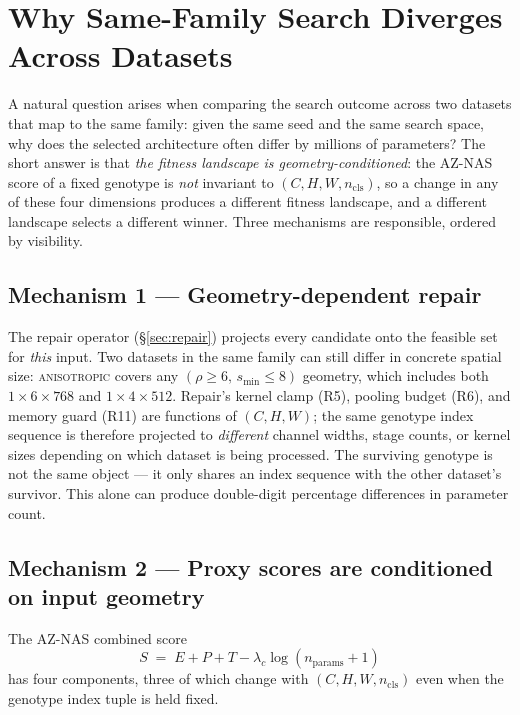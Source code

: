 \documentclass[10pt,twocolumn]{article}
\begin{document}
\section{Why Same-Family Search Diverges Across Datasets}
\label{sec:geometry-sensitivity}

A natural question arises when comparing the search outcome across two
datasets that map to the same family: given the same seed and the same search
space, why does the selected architecture often differ by millions of
parameters? The short answer is that \emph{the fitness landscape is
geometry-conditioned}: the AZ-NAS score of a fixed genotype is \emph{not}
invariant to $(C,H,W,n_{\text{cls}})$, so a change in any of these four
dimensions produces a different fitness landscape, and a different landscape
selects a different winner. Three mechanisms are responsible, ordered by
visibility.

\subsection{Mechanism 1 --- Geometry-dependent repair}
The repair operator (\S\ref{sec:repair}) projects every candidate onto the
feasible set for \emph{this} input. Two datasets in the same family can still
differ in concrete spatial size: \textsc{anisotropic} covers any
$(\rho\!\ge\!6,\,s_{\min}\!\le\!8)$ geometry, which includes both
$1{\times}6{\times}768$ and $1{\times}4{\times}512$. Repair's kernel clamp
(R5), pooling budget (R6), and memory guard (R11) are functions of $(C,H,W)$;
the same genotype index sequence is therefore projected to \emph{different}
channel widths, stage counts, or kernel sizes depending on which dataset is
being processed. The surviving genotype is not the same object --- it only
shares an index sequence with the other dataset's survivor. This alone can
produce double-digit percentage differences in parameter count.

\subsection{Mechanism 2 --- Proxy scores are conditioned on input geometry}
The AZ-NAS combined score
\begin{equation}
S \;=\; E + P + T - \lambda_c \log(n_{\text{params}} + 1)
\end{equation}
has four components, three of which change with $(C,H,W,n_{\text{cls}})$ even
when the genotype index tuple is held fixed.
\end{document}
